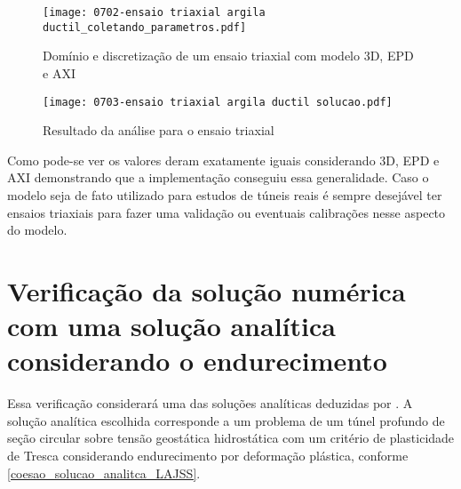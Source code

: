 \begin{figure}[H]
 	\begin{center}
 		\texttt{[image: 0702-ensaio triaxial argila ductil\_coletando\_parametros.pdf]}
 	\end{center}
 	\caption{\label{ensaio_triaxial_parametros}Domínio e discretização de um ensaio triaxial com modelo 3D, EPD e AXI}
\end{figure}

\begin{figure}[H]
	\begin{center}
		\texttt{[image: 0703-ensaio triaxial argila ductil solucao.pdf]}
	\end{center}
	\caption{\label{ensaio_triaxial_solucao}Resultado da análise para o ensaio triaxial}
\end{figure}

Como pode-se ver os valores deram exatamente iguais considerando 3D, EPD e AXI demonstrando que a implementação conseguiu essa generalidade. Caso o modelo seja de fato utilizado para estudos de túneis reais é sempre desejável ter ensaios triaxiais para fazer uma validação ou eventuais calibrações nesse aspecto do modelo.

\section{Verificação da solução numérica com uma solução analítica considerando o endurecimento}

Essa verificação considerará uma das soluções analíticas deduzidas por . A solução analítica escolhida corresponde a um problema de um túnel profundo de seção circular sobre tensão geostática hidrostática com um critério de plasticidade de Tresca considerando endurecimento por deformação plástica, conforme \autoref{coesao_solucao_analitca_LAJSS}. 


